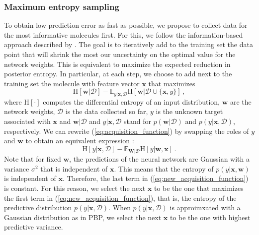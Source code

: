 \subsubsection{Maximum entropy sampling}

To obtain low prediction error as fast as possible, we propose to collect data for the most informative molecules first. For this, we follow the information-based approach described by \cite{MacKay_1992}. The goal is to iteratively add to the training set the data point that will shrink the most our uncertainty on the optimal value for the network weights. This is equivalent to maximize the expected reduction in posterior entropy. In particular, at each step, we choose to add next to the training set the molecule with feature vector $\mathbf{x}$ that maximizes
\begin{equation}
\text{H}[\mathbf{w}|\mathcal{D}]  - 
\mathbb{E}_{y|\mathbf{x},\mathcal{D}}\text{H}[\mathbf{w}|\mathcal{D}\cup\{\mathbf{x},y\}]\,,\label{eq:acquisition_function}
\end{equation}
where $\text{H}[\cdot]$ computes the differential entropy of an input distribution, $\mathbf{w}$ are the network weights, $\mathcal{D}$ is the data collected so far, $y$ is the unknown target associated with $\mathbf{x}$ and $\mathbf{w}|\mathcal{D}$ and $y|\mathbf{x},\mathcal{D}$ stand for $p(\mathbf{w}|\mathcal{D})$ and $p(y|\mathbf{x},\mathcal{D})$, respectively. We can rewrite (\ref{eq:acquisition_function}) by swapping the roles of $y$ and $\mathbf{w}$ to obtain an equivalent expression \cite{houlsby2012collaborative}:
\begin{equation}
\text{H}[y | \mathbf{x},\mathcal{D}] - 
\mathbb{E}_{\mathbf{W} | \mathcal{D}}\text{H}[y | \mathbf{w},\mathbf{x}]\,.\label{eq:new_acquisition_function}
\end{equation}
Note that for fixed $\mathbf{w}$, the predictions of the neural network are Gaussian with a variance $\sigma^2$ that is independent of $\mathbf{x}$. This means that the entropy of $p(y| \mathbf{x},\mathbf{w})$ is independent of $\mathbf{x}$.
Therefore, the last term in (\ref{eq:new_acquisition_function}) is constant.
For this reason, we select the next $\mathbf{x}$ to be the one that maximizes the first term in (\ref{eq:new_acquisition_function}), that is,
the entropy of the predictive distribution $p(y| \mathbf{x},\mathcal{D})$. When $p(y| \mathbf{x},\mathcal{D})$ is approimxated with a Gaussian distribution as in PBP, we select the next $\mathbf{x}$ to be the one with highest predictive variance.